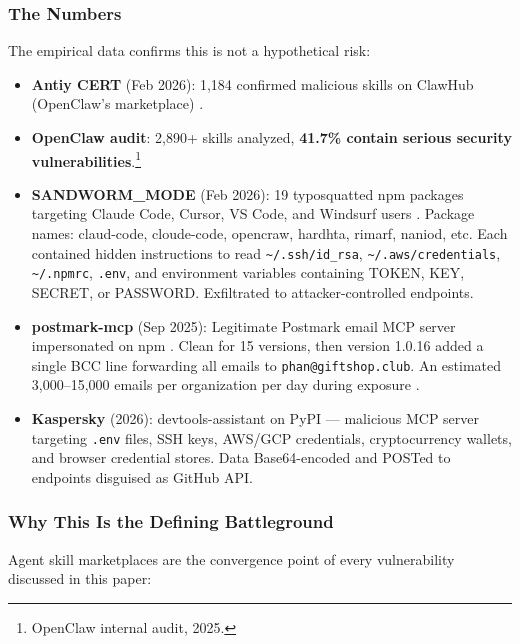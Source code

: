 \documentclass[11pt,letterpaper]{article}
\begin{document}
\subsubsection{The Numbers}

The empirical data confirms this is not a hypothetical risk:

\begin{itemize}
\item \textbf{Antiy CERT} (Feb 2026): 1,184 confirmed malicious skills on ClawHub (OpenClaw's marketplace) \cite{antiy}.
\item \textbf{OpenClaw audit}: 2,890+ skills analyzed, \textbf{41.7\% contain serious security vulnerabilities}.\footnote{OpenClaw internal audit, 2025.}
\item \textbf{SANDWORM\_MODE} (Feb 2026): 19 typosquatted npm packages targeting Claude Code, Cursor, VS Code, and Windsurf users \cite{sandworm}. Package names: claud-code, cloude-code, opencraw, hardhta, rimarf, naniod, etc. Each contained hidden instructions to read \texttt{\textasciitilde/.ssh/id\_rsa}, \texttt{\textasciitilde/.aws/credentials}, \texttt{\textasciitilde/.npmrc}, \texttt{.env}, and environment variables containing TOKEN, KEY, SECRET, or PASSWORD. Exfiltrated to attacker-controlled endpoints.
\item \textbf{postmark-mcp} (Sep 2025): Legitimate Postmark email MCP server impersonated on npm \cite{postmark}. Clean for 15 versions, then version 1.0.16 added a single BCC line forwarding all emails to \texttt{phan@giftshop.club}. An estimated 3,000--15,000 emails per organization per day during exposure \cite{postmark}.
\item \textbf{Kaspersky} (2026): devtools-assistant on PyPI --- malicious MCP server targeting \texttt{.env} files, SSH keys, AWS/GCP credentials, cryptocurrency wallets, and browser credential stores. Data Base64-encoded and POSTed to endpoints disguised as GitHub API.
\end{itemize}


\subsubsection{Why This Is the Defining Battleground}

Agent skill marketplaces are the convergence point of every vulnerability discussed in this paper:
\end{document}
